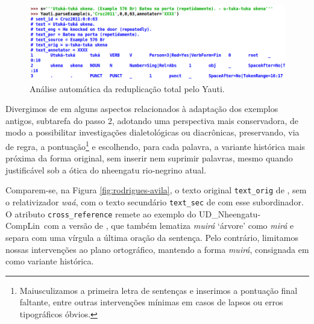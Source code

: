 \documentclass[portuguese]{textolivre}
\newcommand{\wt}[2]{\textit{#1} `#2'}
\newcommand{\tbc}{UD\_Nheengatu-CompLin}
\begin{document}
\begin{figure}[htbp]
  \centering
  \begin{minipage}{.75\textwidth}
    \includegraphics[width=\linewidth]{figures/utuka-tuka.pdf}
    \caption{Análise automática da reduplicação total pelo Yauti.}
    \label{fig:utuka-tuka}
  \end{minipage}
\end{figure}

Divergimos de \textcite{avila2021} em alguns aspectos relacionados à adaptação dos exemplos antigos, subtarefa do passo 2, adotando uma perspectiva mais conservadora, de modo a possibilitar investigações dialetológicas ou diacrônicas, preservando, via de regra, a pontuação\footnote{Maiusculizamos a primeira letra de sentenças e inserimos a pontuação final faltante, entre outras intervenções mínimas em casos de lapsos ou erros tipográficos óbvios.} e escolhendo, para cada palavra, a variante histórica mais próxima da forma original, sem inserir nem suprimir palavras, mesmo quando justificável sob a ótica do nheengatu rio-negrino atual. 

Comparem-se, na Figura \ref{fig:rodrigues-avila}, o texto original \texttt{text\_orig} de \textcite{rodrigues1890}, sem o relativizador \textit{waá}, com o texto secundário \texttt{text\_sec} de \textcite{avila2021} com esse subordinador. O atributo \texttt{cross\_reference} remete ao exemplo do \tbc~com a versão de \textcite{avila2021}, que também lematiza \wt{muirá}{árvore} como \textit{mirá} e separa com uma vírgula a última oração da sentença. Pelo contrário, limitamos nossas intervenções ao plano ortográfico, mantendo a forma \textit{muirá}, consignada em \textcite{avila2021} como variante histórica.
\end{document}
